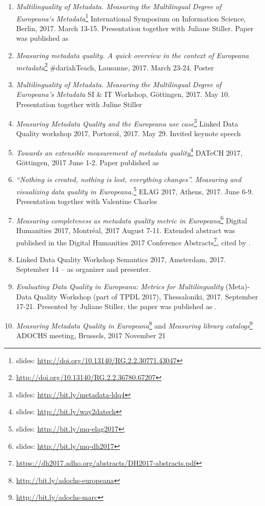 \begin{enumerate}
  \setlength{\parskip}{0pt}
  \setlength{\itemsep}{0pt plus 1pt}
\item \emph{Multilinguality of Metadata. Measuring the Multilingual Degree of Europeana‘s Metadata}\footnote{slides: \url{http://doi.org/10.13140/RG.2.2.30771.43047}} International Symposium on Information Science, Berlin, 2017. March 13-15. Presentation together with Juliane Stiller. Paper was published as \cite{stiller-kiraly2017}
\item \emph{Measuring metadata quality. A quick overview in the context of Europeana metadata}\footnote{\url{http://doi.org/10.13140/RG.2.2.36780.67207}} \#dariahTeach, Lausanne, 2017. March 23-24. Poster
\item \emph{Multilinguality of Metadata. Measuring the Multilingual Degree of Europeana's Metadata} SI \& IT Workshop, Göttingen, 2017. May 10. Presentation together with Juline Stiller
\item \emph{Measuring Metadata Quality and the Europeana use case}\footnote{slides: \url{http://bit.ly/metadata-ldq4}} Linked Data Quality workshop 2017, Portorož, 2017. May 29. Invited keynote speech
\item \emph{Towards an extensible measurement of metadata quality}\footnote{slides: \url{http://bit.ly/way2datech}} DATeCH 2017, Göttingen, 2017 June 1-2. Paper published as \cite{kiraly2017}
\item \emph{``Nothing is created, nothing is lost, everything changes''. Measuring and visualizing data quality in Europeana.}\footnote{slides: \url{http://bit.ly/mq-elag2017}} ELAG 2017, Athens, 2017. June 6-9. Presentation together with Valentine Charles
\item \emph{Measuring completeness as metadata quality metric in Europeana}\footnote{slides: \url{http://bit.ly/mq-dh2017}} Digital Humanities 2017, Montréal, 2017 August 7-11. Extended abstract was published in the Digital Humanities 2017 Conference Abstracts\footnote{\url{https://dh2017.adho.org/abstracts/DH2017-abstracts.pdf}}, cited by \cite{khan2018}.
\item Linked Data Quality Workshop Semantics 2017, Amsterdam, 2017. September 14 -- as organizer and presenter.
\item \emph{Evaluating Data Quality in Europeana: Metrics for Multilinguality} (Meta)-Data Quality Workshop (part of TPDL 2017), Thessaloniki, 2017. September 17-21. Presented by Juliane Stiller, the paper was published as \cite{charles2017}.
\item \emph{Measuring Metadata Quality in Europeana}\footnote{\url{http://bit.ly/adochs-europeana}} and \emph{Measuring library catalogs}\footnote{\url{http://bit.ly/adochs-marc}} ADOCHS meeting, Brussels, 2017 November 21

\end{enumerate}
